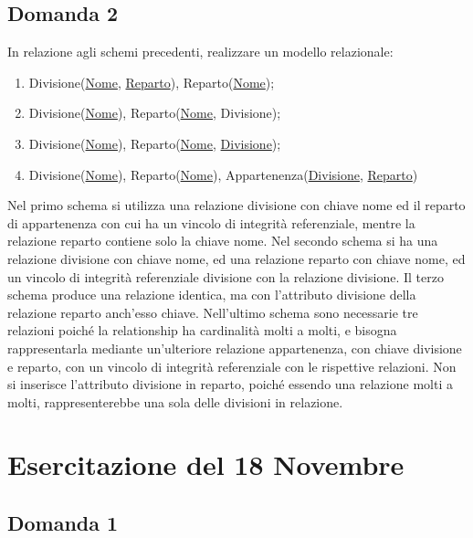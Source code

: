 \documentclass{article}
\numberwithin{equation}{subsection}
\begin{document}
\subsection{Domanda 2}

In relazione agli schemi precedenti, realizzare un modello relazionale:
\begin{enumerate}
    \item Divisione(\underline{Nome}, \underline{Reparto}), Reparto(\underline{Nome});
    \item Divisione(\underline{Nome}), Reparto(\underline{Nome}, Divisione);
    \item Divisione(\underline{Nome}), Reparto(\underline{Nome}, \underline{Divisione});
    \item Divisione(\underline{Nome}), Reparto(\underline{Nome}), Appartenenza(\underline{Divisione}, \underline{Reparto})
\end{enumerate}

Nel primo schema si utilizza una relazione divisione con chiave nome ed il reparto di appartenenza con cui ha un vincolo di integrità referenziale, 
mentre la relazione reparto contiene solo la chiave nome. Nel secondo schema si ha una relazione divisione con chiave nome, ed una relazione reparto 
con chiave nome, ed un vincolo di integrità referenziale divisione con la relazione divisione. Il terzo schema produce una relazione identica, 
ma con l'attributo divisione della relazione reparto anch'esso chiave. Nell'ultimo schema sono necessarie tre relazioni poiché la relationship ha 
cardinalità molti a molti, e bisogna rappresentarla mediante un'ulteriore relazione appartenenza, con chiave divisione e reparto, con un 
vincolo di integrità referenziale con le rispettive relazioni. Non si inserisce l'attributo divisione in reparto, poiché essendo una relazione 
molti a molti, rappresenterebbe una sola delle divisioni in relazione. 


\clearpage

\section{Esercitazione del 18 Novembre}

\subsection{Domanda 1}
\end{document}
